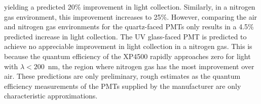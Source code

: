 \noindent
yielding a predicted 20\% improvement in light collection. Similarly,
in a nitrogen gas environment, this improvement increases to 25\%.
However, comparing the air and nitrogen gas environments for the quartz-faced
PMTs only results in a 4.5\% predicted increase in light collection.
The UV glass-faced PMT is predicted to achieve no appreciable improvement
in light collection in a nitrogen gas. This is because the quantum
efficiency of the XP4500 rapidly approaches zero for light with 
$\lambda < 200$~nm, the region where nitrogen gas has the most improvement 
over air.  These predictions are only preliminary, rough estimates as the
quantum efficiency measurements of the PMTs supplied by the manufacturer
are only characteristic approximations. 

